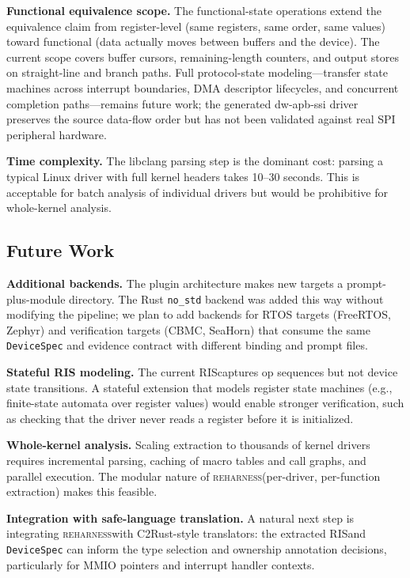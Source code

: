\documentclass[sigplan, screen, review, anonymous]{acmart}
\newcommand{\reharness}{\textsc{reharness}}
\newcommand{\rislang}{RIS}
\begin{document}
\textbf{Functional equivalence scope.} The functional-state operations extend the equivalence claim from register-level (same registers, same order, same values) toward functional (data actually moves between buffers and the device). The current scope covers buffer cursors, remaining-length counters, and output stores on straight-line and branch paths. Full protocol-state modeling---transfer state machines across interrupt boundaries, DMA descriptor lifecycles, and concurrent completion paths---remains future work; the generated dw-apb-ssi driver preserves the source data-flow order but has not been validated against real SPI peripheral hardware.

\textbf{Time complexity.} The libclang parsing step is the dominant cost: parsing a typical Linux driver with full kernel headers takes 10--30 seconds. This is acceptable for batch analysis of individual drivers but would be prohibitive for whole-kernel analysis.

\subsection{Future Work}

\textbf{Additional backends.} The plugin architecture makes new targets a prompt-plus-module directory. The Rust \texttt{no\_std} backend was added this way without modifying the pipeline; we plan to add backends for RTOS targets (FreeRTOS, Zephyr) and verification targets (CBMC, SeaHorn) that consume the same \texttt{DeviceSpec} and evidence contract with different binding and prompt files.

\textbf{Stateful RIS modeling.} The current \rislang captures op sequences but not device state transitions. A stateful extension that models register state machines (e.g., finite-state automata over register values) would enable stronger verification, such as checking that the driver never reads a register before it is initialized.

\textbf{Whole-kernel analysis.} Scaling extraction to thousands of kernel drivers requires incremental parsing, caching of macro tables and call graphs, and parallel execution. The modular nature of \reharness (per-driver, per-function extraction) makes this feasible.

\textbf{Integration with safe-language translation.} A natural next step is integrating \reharness with C2Rust-style translators: the extracted \rislang and \texttt{DeviceSpec} can inform the type selection and ownership annotation decisions, particularly for MMIO pointers and interrupt handler contexts.
\end{document}
